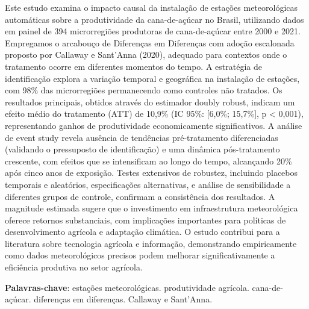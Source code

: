 \documentclass[
	12pt,				%
	openright,			%
	oneside,			%
	a4paper,			%
	english,			%
	french,				%
	spanish,			%
	brazil				%
	]{abntex2}
\begin{document}
\setlength{\absparsep}{18pt} %
\begin{resumo}
Este estudo examina o impacto causal da instalação de estações meteorológicas automáticas sobre a produtividade da cana-de-açúcar no Brasil, utilizando dados em painel de 394 microrregiões produtoras de cana-de-açúcar entre 2000 e 2021. Empregamos o arcabouço de Diferenças em Diferenças com adoção escalonada proposto por Callaway e Sant'Anna (2020), adequado para contextos onde o tratamento ocorre em diferentes momentos do tempo. A estratégia de identificação explora a variação temporal e geográfica na instalação de estações, com 98\% das microrregiões permanecendo como controles não tratados. Os resultados principais, obtidos através do estimador doubly robust, indicam um efeito médio do tratamento (ATT) de 10,9\% (IC 95\%: [6,0\%; 15,7\%], p < 0,001), representando ganhos de produtividade economicamente significativos. A análise de event study revela ausência de tendências pré-tratamento diferenciadas (validando o pressuposto de identificação) e uma dinâmica pós-tratamento crescente, com efeitos que se intensificam ao longo do tempo, alcançando 20\% após cinco anos de exposição. Testes extensivos de robustez, incluindo placebos temporais e aleatórios, especificações alternativas, e análise de sensibilidade a diferentes grupos de controle, confirmam a consistência dos resultados. A magnitude estimada sugere que o investimento em infraestrutura meteorológica oferece retornos substanciais, com implicações importantes para políticas de desenvolvimento agrícola e adaptação climática. O estudo contribui para a literatura sobre tecnologia agrícola e informação, demonstrando empiricamente como dados meteorológicos precisos podem melhorar significativamente a eficiência produtiva no setor agrícola.

 \textbf{Palavras-chave}: estações meteorológicas. produtividade agrícola. cana-de-açúcar. diferenças em diferenças. Callaway e Sant'Anna.
\end{resumo}
\end{document}
